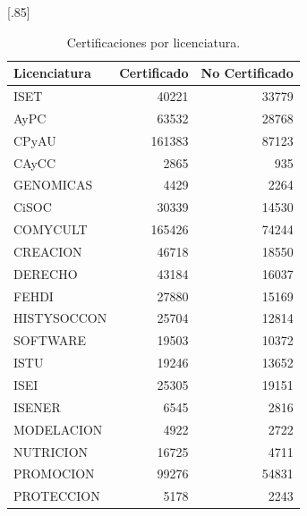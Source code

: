 \documentclass[12pt]{article}
\begin{document}
\begin{table}[ht]
\centering
\scalebox{0.75}[.85]{
\begin{tabular}{lrr}
  \hline
 Licenciatura & Certificado & No Certificado \\ 
  \hline
ISET & 40221 & 33779 \\ 
  AyPC & 63532 & 28768 \\ 
  CPyAU & 161383 & 87123 \\ 
  CAyCC & 2865 & 935 \\ 
  GENOMICAS & 4429 & 2264 \\ 
  CiSOC & 30339 & 14530 \\ 
  COMYCULT & 165426 & 74244 \\ 
  CREACION & 46718 & 18550 \\ 
  DERECHO & 43184 & 16037 \\ 
  FEHDI & 27880 & 15169 \\ 
  HISTYSOCCON & 25704 & 12814 \\ 
  SOFTWARE & 19503 & 10372 \\ 
  ISTU & 19246 & 13652 \\ 
  ISEI & 25305 & 19151 \\ 
  ISENER & 6545 & 2816 \\ 
  MODELACION & 4922 & 2722 \\ 
  NUTRICION & 16725 & 4711 \\ 
  PROMOCION & 99276 & 54831 \\ 
  PROTECCION & 5178 & 2243 \\ 
   \hline
\end{tabular}
}
\caption{\label{Cert_Lic_Cal}Certificaciones por licenciatura.}
\end{table}
\end{document}

